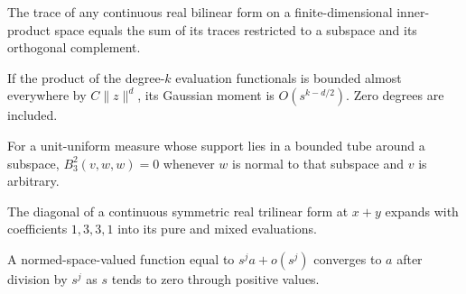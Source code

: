 \begin{lemma}
\label{lem:bilinear-trace-orthogonal-split}

The trace of any continuous real bilinear form on a finite-dimensional inner-product space equals the sum of its traces restricted to a subspace and its orthogonal complement.
\end{lemma}

\begin{lemma}
\label{lem:moment-product-growth}

If the product of the degree-$k$ evaluation functionals is bounded almost everywhere by $C\lVert z\rVert^d$, its Gaussian moment is $O(s^{k-d/2})$. Zero degrees are included.
\end{lemma}

\begin{lemma}
\label{lem:bounded-tube-cubic-vanishing}

For a unit-uniform measure whose support lies in a bounded tube around a subspace, $B_3^2(v,w,w)=0$ whenever $w$ is normal to that subspace and $v$ is arbitrary.
\end{lemma}

\begin{lemma}
\label{lem:symmetric-cubic-binomial}

The diagonal of a continuous symmetric real trilinear form at $x+y$ expands with coefficients $1,3,3,1$ into its pure and mixed evaluations.
\end{lemma}

\begin{lemma}
\label{lem:leading-coefficient-limit}

A normed-space-valued function equal to $s^j a+o(s^j)$ converges to $a$ after division by $s^j$ as $s$ tends to zero through positive values.
\end{lemma}

